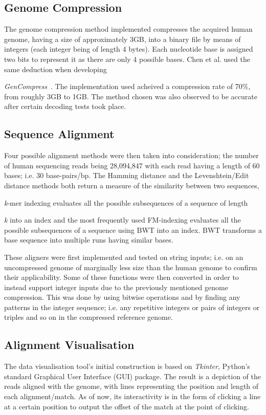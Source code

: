 \documentclass{csfyp}
\begin{document}
\subsection{Genome Compression}\vspace{-2ex}
The genome compression method implemented compresses the acquired human genome, having a size of approximately 3GB, into a binary file by means of integers (each integer being of length 4 bytes).  Each nucleotide base is assigned two bits to represent it as there are only 4 possible bases. Chen et al. used the same deduction when developing {\textit{GenCompress}~\cite{gencompress}.  The implementation used acheived a compression rate of 70\%, from roughly 3GB to 1GB.  The method chosen was also observed to be accurate after certain decoding tests took place.        

\subsection{Sequence Alignment}\vspace{-2ex}
Four possible alignment methods were then taken into consideration; the number of human sequencing reads being 28,094,847 with each read having a length of 60 bases; i.e. 30 base-pairs/bp.  The Hamming distance and the Levenshtein/Edit distance methods both return a measure of the similarity between two sequences,  {\textit{k}-mer indexing evaluates all the possible subsequences of a sequence of length {\textit{k} into an index and the most frequently used FM-indexing evaluates all the possible subsequences of a sequence using BWT into an index.  BWT transforms a base sequence into multiple runs having similar bases.  

These aligners were first implemented and tested on string inputs; i.e. on an uncompressed genome of marginally less size than the human genome to confirm their applicability.  Some of these functions were then converted in order to instead support integer inputs due to the previously mentioned genome compression.  This was done by using bitwise operations and by finding any patterns in the integer sequence; i.e. any repetitive integers or pairs of integers or triples and so on in the compressed reference genome.        

\subsection{Alignment Visualisation}\vspace{-2ex}
The data visualisation tool's initial construction is based on {\textit{Tkinter}}, Python's standard Graphical User Interface (GUI) package.  The result is a depiction of the reads aligned with the genome, with lines representing the position and length of each alignment/match.  As of now, its interactivity is in the form of clicking a line at a certain position to output the offset of the match at the point of clicking.     

}}}
\end{document}
